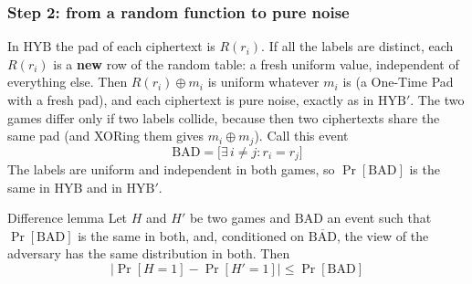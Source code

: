 \subsubsection{Step 2: from a random function to pure noise}

In $\mathrm{HYB}$ the pad of each ciphertext is $R(r_i)$. If all the labels are distinct, each $R(r_i)$ is a \textbf{new} row of the random table: a fresh uniform value, independent of everything else. Then $R(r_i) \oplus m_i$ is uniform whatever $m_i$ is (a One-Time Pad with a fresh pad), and each ciphertext is pure noise, exactly as in $\mathrm{HYB}'$. The two games differ only if two labels collide, because then two ciphertexts share the same pad (and XORing them gives $m_i \oplus m_j$). Call this event
\[
  \mathrm{BAD} = \big[\exists\, i \neq j : r_i = r_j\big]
\]
The labels are uniform and independent in both games, so $\Pr[\mathrm{BAD}]$ is the same in $\mathrm{HYB}$ and in $\mathrm{HYB}'$.

\begin{framedlem}[label={lem:difference}]{Difference lemma}
  Let $H$ and $H'$ be two games and $\mathrm{BAD}$ an event such that $\Pr[\mathrm{BAD}]$ is the same in both, and, conditioned on $\overline{\mathrm{BAD}}$, the view of the adversary has the same distribution in both. Then
  \[
    \big|\Pr[H = 1] - \Pr[H' = 1]\big| \leq \Pr[\mathrm{BAD}]
  \]
\end{framedlem}

